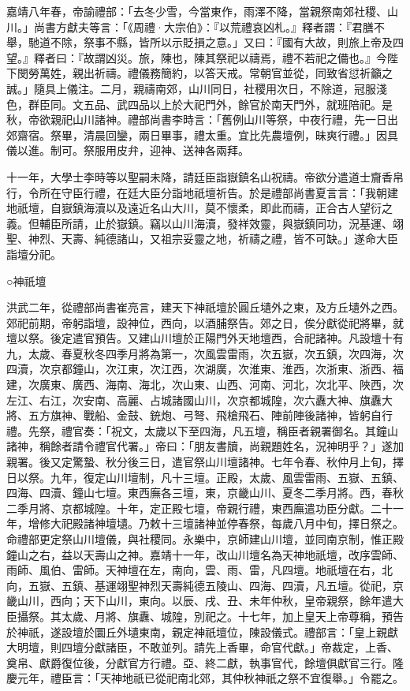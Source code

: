 嘉靖八年春，帝諭禮部：「去冬少雪，今當東作，雨澤不降，當親祭南郊社稷、山川。」尚書方獻夫等言：「《周禮·大宗伯》：『以荒禮哀凶札。』釋者謂：『君膳不舉，馳道不除，祭事不縣，皆所以示貶損之意。」又曰：『國有大故，則旅上帝及四望。』釋者曰：『故謂凶災。旅，陳也，陳其祭祀以禱焉，禮不若祀之備也。』今陛下閔勞萬姓，親出祈禱。禮儀務簡約，以答天戒。常朝官並從，同致省愆祈籲之誠。」隨具上儀注。二月，親禱南郊，山川同日，社稷用次日，不除道，冠服淺色，群臣同。文五品、武四品以上於大祀門外，餘官於南天門外，就班陪祀。是秋，帝欲親祀山川諸神。禮部尚書李時言：「舊例山川等祭，中夜行禮，先一日出郊齋宿。祭畢，清晨回鑾，兩日畢事，禮太重。宜比先農壇例，昧爽行禮。」因具儀以進。制可。祭服用皮弁，迎神、送神各兩拜。

十一年，大學士李時等以聖嗣未降，請廷臣詣嶽鎮名山祝禱。帝欲分遣道士齎香帛行，令所在守臣行禮，在廷大臣分詣地祇壇祈告。於是禮部尚書夏言言：「我朝建地祇壇，自嶽鎮海瀆以及遠近名山大川，莫不懷柔，即此而禱，正合古人望衍之義。但輔臣所請，止於嶽鎮。竊以山川海瀆，發祥效靈，與嶽鎮同功，況基運、翊聖、神烈、天壽、純德諸山，又祖宗妥靈之地，祈禱之禮，皆不可缺。」遂命大臣詣壇分祀。

○神祇壇

洪武二年，從禮部尚書崔亮言，建天下神祇壇於圓丘壝外之東，及方丘壝外之西。郊祀前期，帝躬詣壇，設神位，西向，以酒脯祭告。郊之日，俟分獻從祀將畢，就壇以祭。後定遣官預告。又建山川壇於正陽門外天地壇西，合祀諸神。凡設壇十有九，太歲、春夏秋冬四季月將為第一，次風雲雷雨，次五嶽，次五鎮，次四海，次四瀆，次京都鐘山，次江東，次江西，次湖廣，次淮東、淮西，次浙東、浙西、福建，次廣東、廣西、海南、海北，次山東、山西、河南、河北，次北平、陜西，次左江、右江，次安南、高麗、占城諸國山川，次京都城隍，次六纛大神、旗纛大將、五方旗神、戰船、金鼓、銃炮、弓弩、飛槍飛石、陣前陣後諸神，皆躬自行禮。先祭，禮官奏：「祝文，太歲以下至四海，凡五壇，稱臣者親署御名。其鐘山諸神，稱餘者請令禮官代署。」帝曰：「朋友書牘，尚親題姓名，況神明乎？」遂加親署。後又定驚蟄、秋分後三日，遣官祭山川壇諸神。七年令春、秋仲月上旬，擇日以祭。九年，復定山川壇制，凡十三壇。正殿，太歲、風雲雷雨、五嶽、五鎮、四海、四瀆、鐘山七壇。東西廡各三壇，東，京畿山川、夏冬二季月將。西，春秋二季月將、京都城隍。十年，定正殿七壇，帝親行禮，東西廡遣功臣分獻。二十一年，增修大祀殿諸神壇壝。乃敕十三壇諸神並停春祭，每歲八月中旬，擇日祭之。命禮部更定祭山川壇儀，與社稷同。永樂中，京師建山川壇，並同南京制，惟正殿鐘山之右，益以天壽山之神。嘉靖十一年，改山川壇名為天神地祇壇，改序雲師、雨師、風伯、雷師。天神壇在左，南向，雲、雨、雷，凡四壇。地祇壇在右，北向，五嶽、五鎮、基運翊聖神烈天壽純德五陵山、四海、四瀆，凡五壇。從祀，京畿山川，西向；天下山川，東向。以辰、戌、丑、未年仲秋，皇帝親祭，餘年遣大臣攝祭。其太歲、月將、旗纛、城隍，別祀之。十七年，加上皇天上帝尊稱，預告於神祇，遂設壇於圜丘外壝東南，親定神祇壇位，陳設儀式。禮部言：「皇上親獻大明壇，則四壇分獻諸臣，不敢並列。請先上香畢，命官代獻。」帝裁定，上香、奠帛、獻爵復位後，分獻官方行禮。亞、終二獻，執事官代，餘壇俱獻官三行。隆慶元年，禮臣言：「天神地祇已從祀南北郊，其仲秋神祇之祭不宜復舉。」令罷之。

